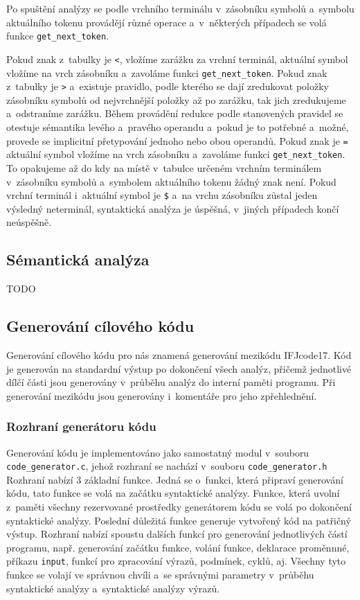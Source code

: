 \documentclass[a4paper, 11pt]{article}
\begin{document}
	Po spuštění analýzy se podle vrchního terminálu v~zásobníku symbolů a~symbolu aktuálního tokenu provádějí různé
	operace a~v~některých případech se volá funkce \texttt{get\_next\_token}.

	Pokud znak z~tabulky je \texttt{<}, vložíme zarážku za vrchní terminál, aktuální symbol vložíme na vrch zásobníku
	a~zavoláme funkci \texttt{get\_next\_token}. Pokud znak z~tabulky je \texttt{>} a~existuje pravidlo, podle kterého
	se dají zredukovat položky zásobníku symbolů od nejvrchnější položky až po zarážku, tak jich zredukujeme a~odstraníme
	zarážku. Během provádění redukce podle stanovených pravidel se otestuje sémantika levého a~pravého operandu a~pokud
	je to potřebné a~možné, provede se implicitní přetypování jednoho nebo obou operandů. Pokud znak je \texttt{=} aktuální
	symbol vložíme na vrch zásobníku a~zavoláme funkci \texttt{get\_next\_token}. To opakujeme až do kdy na místě v~tabulce
	určeném vrchním terminálem v~zásobníku symbolů a~symbolem aktuálního tokenu žádný znak není. Pokud vrchní terminál
	i~aktuální symbol je \texttt{\$} a~na vrchu zásobníku zůstal jeden výsledný neterminál, syntaktická analýza je
	úspěšná, v~jiných případech končí neúspěšně.

	\subsection{Sémantická analýza}

	TODO


	\subsection{Generování cílového kódu}

	Generování cílového kódu pro nás znamená generování mezikódu IFJcode17. Kód je generován na standardní výstup
	po dokončení všech analýz, přičemž jednotlivé dílčí části jsou generovány v~průběhu analýz do interní paměti
	programu. Při generování mezikódu jsou generovány i~komentáře pro jeho zpřehlednění.

	\subsubsection{Rozhraní generátoru kódu}

	Generování kódu je implementováno jako samostatný modul v~souboru \texttt{code\_generator.c},
	jehož rozhraní se nachází v~souboru \texttt{code\_generator.h} Rozhraní nabízí 3 základní funkce.
	Jedná se o~funkci, která připraví generování kódu, tato funkce se volá na začátku syntaktické analýzy.
	Funkce, která uvolní z~paměti všechny rezervované prostředky generátorem kódu se volá po dokončení
	syntaktické analýzy. Poslední důležitá funkce generuje vytvořený kód na patřičný výstup. Rozhraní
	nabízí spoustu dalších funkcí pro generování jednotlivých částí programu, např. generování začátku
	funkce, volání funkce, deklarace proměnnné, příkazu \texttt{input}, funkcí pro zpracování výrazů,
	podmínek, cyklů, aj. Všechny tyto funkce se volají ve správnou chvíli a~se správnými
	parametry v~průběhu syntaktické analýzy a~syntaktické analýzy výrazů.
\end{document}
